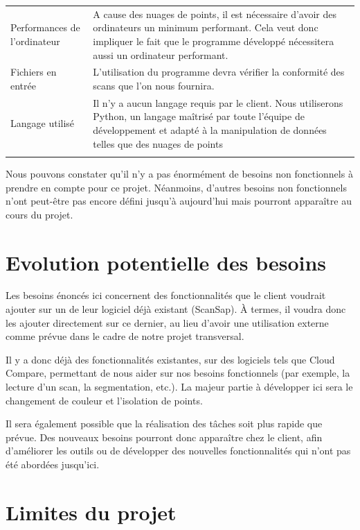 \documentclass[12pt,titlepage,french]{article}
\begin{document}
\noindent\begin{tabu} to \textwidth {X[c]X[c3]}\toprule
{}&\\\toprule
Performances de l'ordinateur
& A cause des nuages de points, il est nécessaire d'avoir des ordinateurs un minimum performant. Cela veut donc impliquer le fait que le programme développé nécessitera aussi un ordinateur performant.\\\midrule
Fichiers en entrée
& L'utilisation du programme devra vérifier la conformité des scans que l'on nous fournira.\\\midrule
Langage utilisé
& Il n'y a aucun langage requis par le client. Nous utiliserons Python, un langage maîtrisé par toute l'équipe de développement et adapté à la manipulation de données telles que des nuages de points\\\bottomrule \\
\end{tabu}

Nous pouvons constater qu'il n'y a pas énormément de besoins non fonctionnels à prendre en compte pour ce projet. Néanmoins, d'autres besoins non fonctionnels n'ont peut-être pas encore défini jusqu'à aujourd'hui mais pourront apparaître au cours du projet.

\section{Evolution potentielle des besoins}

Les besoins énoncés ici concernent des fonctionnalités que le client voudrait ajouter sur un de leur logiciel déjà existant (ScanSap). À termes, il voudra donc les ajouter directement sur ce dernier, au lieu d'avoir une utilisation externe comme prévue dans le cadre de notre projet transversal.

Il y a donc déjà des fonctionnalités existantes, sur des logiciels tels que Cloud Compare, permettant de nous aider sur nos besoins fonctionnels (par exemple, la lecture d'un scan, la segmentation, etc.). La majeur partie à développer ici sera le changement de couleur et l'isolation de points.

Il sera également possible que la réalisation des tâches soit plus rapide que prévue. Des nouveaux besoins pourront donc apparaître chez le client, afin d'améliorer les outils ou de développer des nouvelles fonctionnalités qui n'ont pas été abordées jusqu'ici.


\section{Limites du projet}
\end{document}
